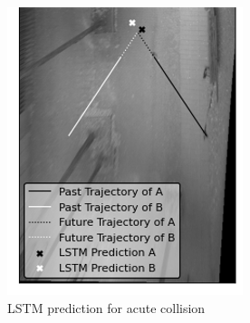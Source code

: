 \documentclass{article}
\begin{document}
\begin{figure}[H]
\centering
\begin{subfigure}{0.4\textwidth}
  \centering
  \includegraphics[width=\linewidth]{quali_results/sim-acu-l.png}
  \caption{LSTM prediction for acute collision}
  \label{fig:sim-acu-l}
\end{subfigure}
\begin{subfigure}{0.4\textwidth}
  \centering

\end{subfigure}
\end{figure}
\end{document}
